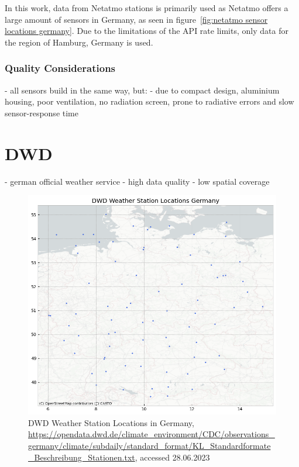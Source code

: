 In this work, data from Netatmo stations is primarily used as Netatmo offers a large amount of sensors in Germany, as seen in figure~\ref{fig:netatmo sensor locations germany}. Due to the limitations of the API rate limits, only data for the region of Hamburg, Germany is used.

\subsubsection{Quality Considerations}
- all sensors build in the same way, but:
  - due to compact design, aluminium housing, poor ventilation, no radiation screen, prone to radiative errors and slow sensor-response time \cite{meier2017crowdsourcing, buchau2018modelling}

\section{DWD}

- german official weather service
- high data quality
- low spatial coverage

\begin{figure}[ht]
    \centering
    \includegraphics[width=1\textwidth]{images/dwd_weather_station_locations_germany.png}
    \caption{DWD Weather Station Locations in Germany, \url{https://opendata.dwd.de/climate_environment/CDC/observations_germany/climate/subdaily/standard_format/KL_Standardformate_Beschreibung_Stationen.txt}, accessed 28.06.2023}
    \label{fig:dwd sensor locations germany}
\end{figure}

